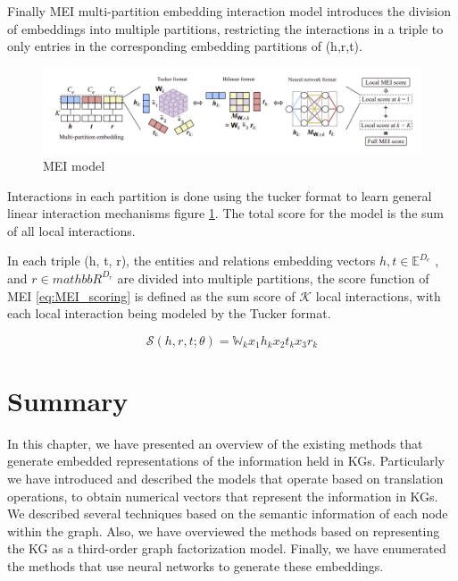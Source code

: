 Finally MEI \cite{} multi-partition embedding interaction model introduces the division of embeddings into multiple partitions, restricting the interactions in a triple to only entries in the corresponding embedding partitions of (h,r,t).

\begin{figure}[!ht]
    \centering
    \includegraphics[width=\textwidth]{fig/embeddings/MEI.png}
    \caption{MEI model}
    \label{fig:emb-MEI}
\end{figure}

Interactions in each partition is done using the tucker format\cite{} to learn general linear interaction mechanisms figure \ref{fig:emb-MEI}. The total score for the model is the sum of all local interactions. 

In each triple (h, t, r), the entities and relations embedding vectors $h, t \in \mathbb{E}^{D_e}$ , and $r \in mathbb{R}^{D_r}$ are divided into multiple partitions, the score function of MEI \ref{eq:MEI_scoring} is defined as the sum score of $\mathcal{K}$ local interactions, with each local interaction being modeled by the Tucker format.

\begin{equation}
    \label{eq:MEI_scoring}
    \mathcal{S}(h, r, t; \theta) = \mathbb{W}_k x_1 h_k x_2 t_k x_3 r_k
\end{equation}

\section{Summary}\label{sec:emb-summary}
In this chapter, we have presented an overview of the existing methods that generate embedded representations of the information held in KGs. Particularly we have introduced and described the models that operate based on translation operations, to obtain numerical vectors that represent the information in KGs. We described several techniques based on the semantic information of each node within the graph. Also, we have overviewed the methods based on representing the KG as a third-order graph factorization model. Finally, we have enumerated the methods that use neural networks to generate these embeddings.
